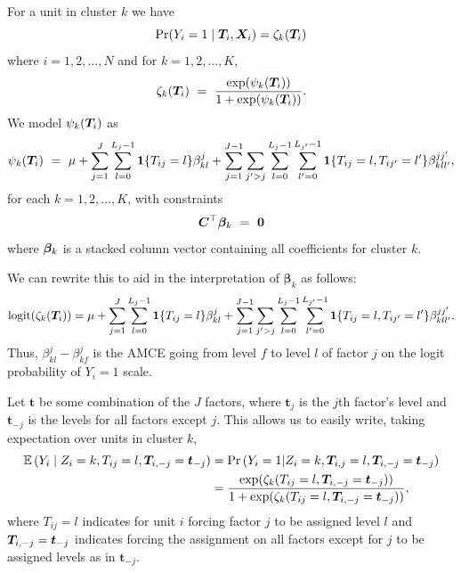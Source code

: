 For a unit in cluster $k$ we have
\begin{equation}
\Pr(Y_i = 1 \mid \bm{T}_i, \bm{X}_i)  = \zeta_{k}(\bm{T}_i) 
\end{equation}
where $i=1,2,\ldots,N$ and for $k=1,2,\ldots,K$,
\begin{equation}
  \zeta_{k}(\bm{T}_i) \
= \ \frac{\exp(\psi_{k}(\bm{T}_i))}{1+\exp(\psi_{k}(\bm{T}_i))}.
\end{equation}
We model $\psi_{k}(\bm{T}_i)$ as
\begin{equation}
\label{eq:define_lp}
\psi_{k}(\bm{T}_i) \ =\ \mu + \sum_{j=1}^J \sum_{l =0}^{L_j-1} 
\mathbf{1}\{T_{ij} = l\} \beta^j_{kl} + \sum_{j=1}^{J-1} \sum_{j' >
  j} \sum_{l=0}^{L_j-1} \sum_{l' = 0}^{L_{j'}-1} \mathbf{1}\{T_{ij} = l,
T_{ij'} = l'\} \beta^{jj'}_{kll'}, 
\end{equation}
for each $k=1,2,\ldots,K$, with constraints
\begin{equation}
  \bC^\top \bbeta_k \ = \ \bm{0} %
\end{equation}
where $\bm{\beta}_k$ is a stacked column vector containing all coefficients
for cluster $k$.


We can rewrite this to aid in the interpretation of $\bm{\beta}_k$ as follows:
\begin{align*}
  \text{logit}(\zeta_{k}(\bm{T}_i))= \mu + \sum_{j=1}^J \sum_{l =0}^{L_j-1} 
\mathbf{1}\{T_{ij} = l\} \beta^j_{kl} + \sum_{j=1}^{J-1} \sum_{j' >
  j} \sum_{l=0}^{L_j-1} \sum_{l' = 0}^{L_{j'}-1} \mathbf{1}\{T_{ij} = l,
T_{ij'} = l'\} \beta^{jj'}_{kll'}.
\end{align*}
Thus, $\beta^j_{kl}-\beta^j_{kf}$ is the AMCE going from level $f$ to level $l$ of factor $j$ on the logit probability of $Y_i=1$ scale.
 
 Let $\bm{t}$ be some combination of the $J$ factors, where $\bm{t}_j$ is the $j$th factor's level and $\bm{t}_{-j}$ is the levels for all factors except $j$.
This allows us to easily write, taking expectation over units in cluster $k$,
 \begin{align*}
 \mathbb{E}\left(Y_i\mid Z_i=k, {T}_{ij}=l, \bm{T}_{i,-j} = \bm{t}_{-j}\right)
   &= \Pr\left(Y_i = 1|Z_i=k, \bm{T}_{i,j}=l, \bm{T}_{i,-j} = \bm{t}_{-j}\right)\\
 &= \frac{\exp( \zeta_{k}(T_{ij} = l, \bm{T}_{i,-j} = \bm{t}_{-j}))}{1+\exp(\zeta_{k}(T_{ij} = l, \bm{T}_{i,-j} = \bm{t}_{-j}))},
 \end{align*}
 where $T_{ij} = l$ indicates for unit $i$ forcing factor $j$ to be assigned level $l$ and $\bm{T}_{i,-j} = \bm{t}_{-j}$ indicates forcing the assignment on all factors except for $j$ to be assigned levels as in $\bm{t}_{-j}$.
 
